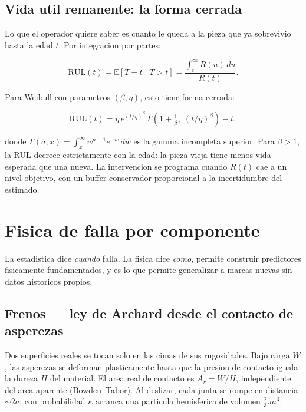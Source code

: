 \documentclass[11pt,a4paper]{article}
\begin{document}
\subsection{Vida util remanente: la forma cerrada}

Lo que el operador quiere saber es cuanto le queda a la pieza que
ya sobrevivio hasta la edad $t$. Por integracion por partes:

$$\mathrm{RUL}(t) = \mathbb{E}[T - t \mid T > t]
  = \frac{\displaystyle\int_t^{\infty} R(u)\,du}{R(t)}.$$

Para Weibull con parametros $(\beta,\eta)$, esto tiene forma cerrada:

$$\mathrm{RUL}(t) = \eta\,e^{(t/\eta)^{\beta}}
  \,\Gamma\!\left(1+\tfrac{1}{\beta},\;(t/\eta)^{\beta}\right) - t,$$

donde $\Gamma(a,x) = \int_x^\infty w^{a-1}e^{-w}\,dw$ es la gamma incompleta
superior. Para $\beta > 1$, la RUL decrece estrictamente con la edad: la
pieza vieja tiene menos vida esperada que una nueva. La intervencion se
programa cuando $R(t)$ cae a un nivel objetivo, con un buffer conservador
proporcional a la incertidumbre del estimado.

\section{Fisica de falla por componente}

La estadistica dice \emph{cuando} falla. La fisica dice \emph{como},
permite construir predictores fisicamente fundamentados, y es lo que
permite generalizar a marcas nuevas sin datos historicos propios.

\subsection{Frenos --- ley de Archard desde el contacto de asperezas}

Dos superficies reales se tocan solo en las cimas de sus rugosidades. Bajo
carga $W$, las asperezas se deforman plasticamente hasta que la presion
de contacto iguala la dureza $H$ del material. El area real de contacto es
$A_r = W/H$, independiente del area aparente (Bowden--Tabor). Al deslizar,
cada junta se rompe en distancia $\sim 2a$; con probabilidad $\kappa$ arranca
una particula hemisferica de volumen $\frac{2}{3}\pi a^3$:
\end{document}
